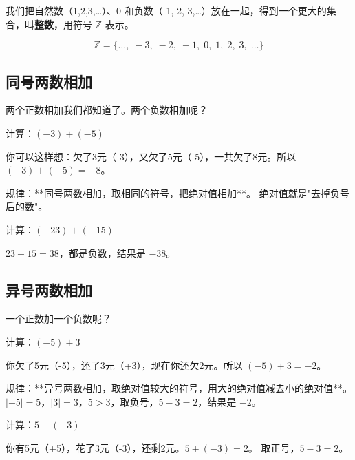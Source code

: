 我们把自然数（1,2,3,\ldots）、0 和负数（-1,-2,-3,\ldots）放在一起，得到一个更大的集合，叫\textbf{整数}，用符号 $\mathbb{Z}$ 表示。

\[
\mathbb{Z} = \{\ldots,\;-3,\;-2,\;-1,\;0,\;1,\;2,\;3,\;\ldots\}
\]

\subsection*{同号两数相加}

两个正数相加我们都知道了。两个负数相加呢？

\begin{example}
计算：$(-3)+(-5)$
\end{example}
\begin{solution}
你可以这样想：欠了3元（-3），又欠了5元（-5），一共欠了8元。所以 $(-3)+(-5) = -8$。

规律：**同号两数相加，取相同的符号，把绝对值相加**。
绝对值就是"去掉负号后的数"。
\end{solution}

\begin{example}
计算：$(-23)+(-15)$
\end{example}
\begin{solution}
$23+15=38$，都是负数，结果是 $-38$。
\end{solution}

\subsection*{异号两数相加}

一个正数加一个负数呢？

\begin{example}
计算：$(-5)+3$
\end{example}
\begin{solution}
你欠了5元（-5），还了3元（+3），现在你还欠2元。所以 $(-5)+3 = -2$。

规律：**异号两数相加，取绝对值较大的符号，用大的绝对值减去小的绝对值**。
$|-5|=5$，$|3|=3$，$5>3$，取负号，$5-3=2$，结果是 $-2$。
\end{solution}

\begin{example}
计算：$5+(-3)$
\end{example}
\begin{solution}
你有5元（+5），花了3元（-3），还剩2元。$5+(-3)=2$。
取正号，$5-3=2$。
\end{solution}

